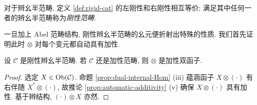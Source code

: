 \begin{definition}\label{def:rigid-cat-braided}
	对于辫幺半范畴, 定义 \ref{def:rigid-cat} 的左刚性和右刚性相互等价; 满足其中任何一者的辫幺半范畴称为\emph{刚性范畴}.
\end{definition}

一旦加上 Abel 范畴结构, 刚性辫幺半范畴的幺元便折射出特殊的性质. 我们首先证明此时 $\otimes$ 对每个变元都自动具有加性.

\begin{proposition}\label{prop:rigid-additive}
	设 $\mathcal{C}$ 是刚性辫幺半范畴. 若 $\mathcal{C}$ 还是加性范畴, 则 $\otimes$ 是加性双函子.
\end{proposition}
\begin{proof}
	选定 $X \in \operatorname{Ob}(\mathcal{C})$. 命题 \ref{prop:dual-internal-Hom} (iii) 蕴涵函子 $X \otimes (\cdot)$ 有右伴随 $X^* \otimes (\cdot)$, 故推论 \ref{prop:automatic-additivity} (v) 确保 $X \otimes (\cdot)$ 具有加性. 基于辫结构, $(\cdot) \otimes X$ 亦然.
\end{proof}

